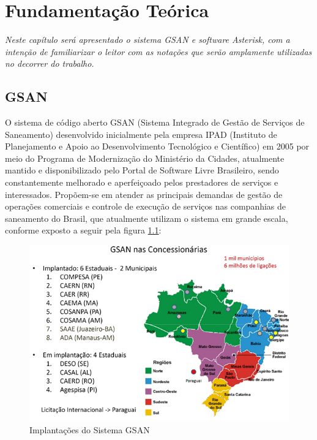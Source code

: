\chapter[Fundamentação Teórica]{\textbf{F}undamentação \textbf{T}eórica}

\textit{Neste capítulo será apresentado o sistema GSAN e software Asterisk, com a intenção de familiarizar o leitor com as notações que serão amplamente utilizadas no decorrer do trabalho.}


\section{GSAN}
O sistema de código aberto GSAN (Sistema Integrado de Gestão de Serviços de Saneamento) desenvolvido inicialmente pela empresa IPAD (Instituto de Planejamento e Apoio ao Desenvolvimento Tecnológico e Científico) em 2005 por meio do Programa de Modernização do Ministério da Cidades, atualmente mantido e disponibilizado pelo Portal de Software Livre Brasileiro, sendo constantemente melhorado e aperfeiçoado pelos prestadores de serviços e interessados. Propõem-se em atender as principais demandas de gestão de operações comerciais e controle de execução de serviços nas companhias de saneamento do Brasil, que atualmente utilizam o sistema em grande escala, conforme exposto a seguir pela figura \ref{figura:implantacaoSistemaGSAN}:


\begin{figure}[H]
	\centering
	\caption{Implantações do Sistema GSAN}	
	\label{figura:implantacaoSistemaGSAN}
	\includegraphics{figuras/implantacaoGSAN.png}
\end{figure}


